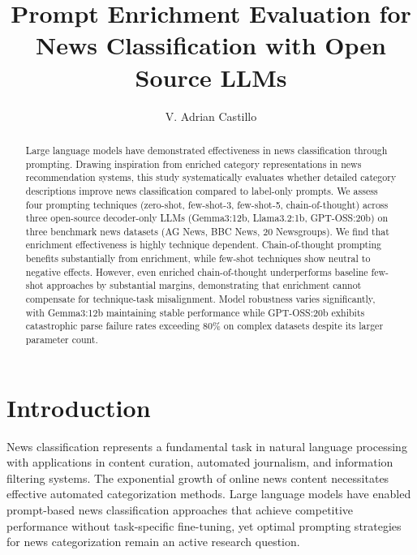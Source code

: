 \documentclass[sigconf,nonacm]{acmart}
\begin{document}
\title{Prompt Enrichment Evaluation for News Classification with Open Source LLMs}

\author{V. Adrian Castillo}

\begin{abstract}
Large language models have demonstrated effectiveness in news classification through prompting. Drawing inspiration from enriched category representations in news recommendation systems, this study systematically evaluates whether detailed category descriptions improve news classification compared to label-only prompts. We assess four prompting techniques (zero-shot, few-shot-3, few-shot-5, chain-of-thought) across three open-source decoder-only LLMs (Gemma3:12b, Llama3.2:1b, GPT-OSS:20b) on three benchmark news datasets (AG News, BBC News, 20 Newsgroups). We find that enrichment effectiveness is highly technique dependent. Chain-of-thought prompting benefits substantially from enrichment, while few-shot techniques show neutral to negative effects. However, even enriched chain-of-thought underperforms baseline few-shot approaches by substantial margins, demonstrating that enrichment cannot compensate for technique-task misalignment. Model robustness varies significantly, with Gemma3:12b maintaining stable performance while GPT-OSS:20b exhibits catastrophic parse failure rates exceeding 80\% on complex datasets despite its larger parameter count.
\end{abstract}

\maketitle

\section{Introduction}

News classification represents a fundamental task in natural language processing with applications in content curation, automated journalism, and information filtering systems. The exponential growth of online news content necessitates effective automated categorization methods. Large language models have enabled prompt-based news classification approaches that achieve competitive performance without task-specific fine-tuning, yet optimal prompting strategies for news categorization remain an active research question.
\end{document}
